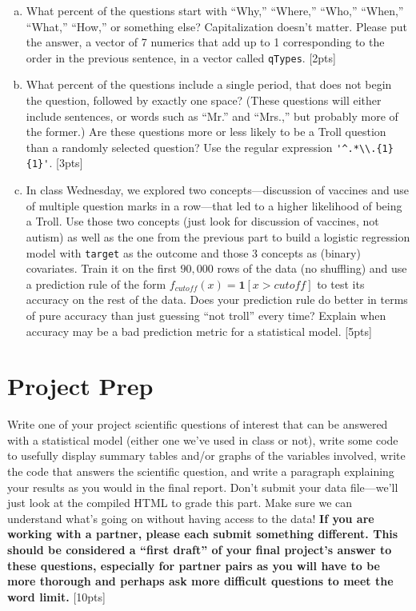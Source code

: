 \documentclass[12pt]{article}
\newcommand{\Ind}{\textbf{1}}
\begin{document}
\begin{enumerate}[(a)]
	\item What percent of the questions start with ``Why,'' ``Where,'' ``Who,'' ``When,'' ``What,'' ``How,'' or something else? Capitalization doesn't matter. Please put the answer, a vector of 7 numerics that add up to 1 corresponding to the order in the previous sentence, in a vector called \verb|qTypes|. [2pts]
	\item What percent of the questions include a single period, that does not begin the question, followed by exactly one space? (These questions will either include sentences, or words such as ``Mr.'' and ``Mrs.,'' but probably more of the former.) Are these questions more or less likely to be a Troll question than a randomly selected question? Use the regular expression \verb|'^.*\\.{1} {1}'|. [3pts]
	\item In class Wednesday, we explored two concepts---discussion of vaccines and use of multiple question marks in a row---that led to a higher likelihood of being a Troll. Use those two concepts (just look for discussion of vaccines, not autism) as well as the one from the previous part to build a logistic regression model with \verb|target| as the outcome and those 3 concepts as (binary) covariates. Train it on the first $90,000$ rows of the data (no shuffling) and use a prediction rule of the form $f_{cutoff}(x) = \Ind[x > cutoff]$ to test its accuracy on the rest of the data. Does your prediction rule do better in terms of pure accuracy than just guessing ``not troll'' every time? Explain when accuracy may be a bad prediction metric for a statistical model. [5pts]
\end{enumerate}

\section{Project Prep}

Write one of your project scientific questions of interest that can be answered with a statistical model (either one we've used in class or not), write some code to usefully display summary tables and/or graphs of the variables involved, write the code that answers the scientific question, and write a paragraph explaining your results as you would in the final report. Don't submit your data file---we'll just look at the compiled HTML to grade this part. Make sure we can understand what's going on without having access to the data! \textbf{If you are working with a partner, please each submit something different. This should be considered a ``first draft'' of your final project's answer to these questions, especially for partner pairs as you will have to be more thorough and perhaps ask more difficult questions to meet the word limit.} [10pts]
\end{document}
